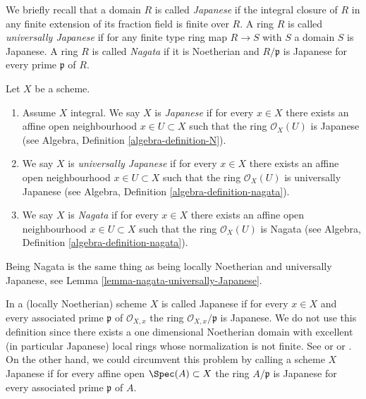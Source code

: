 \medskip\noindent
We briefly recall that a domain $R$ is called {\it Japanese} if the integral
closure of $R$ in any finite extension of its fraction field is finite over
$R$. A ring $R$ is called {\it universally Japanese} if for any finite type
ring map $R \to S$ with $S$ a domain $S$ is Japanese. A ring $R$ is called
{\it Nagata} if it is Noetherian and $R/\mathfrak p$ is Japanese for every
prime $\mathfrak p$ of $R$.

\begin{definition}
\label{definition-nagata}
Let $X$ be a scheme.
\begin{enumerate}
\item Assume $X$ integral. We say $X$ is {\it Japanese}
if for every $x \in X$ there exists an
affine open neighbourhood $x \in U \subset X$ such that the ring
$\mathcal{O}_X(U)$ is Japanese (see
Algebra, Definition \ref{algebra-definition-N}).
\item We say $X$ is {\it universally Japanese} if for every $x \in X$
there exists an affine open neighbourhood $x \in U \subset X$ such that
the ring $\mathcal{O}_X(U)$ is universally Japanese (see
Algebra, Definition \ref{algebra-definition-nagata}).
\item We say $X$ is {\it Nagata} if for every $x \in X$ there exists an
affine open neighbourhood $x \in U \subset X$ such that the ring
$\mathcal{O}_X(U)$ is Nagata (see
Algebra, Definition \ref{algebra-definition-nagata}).
\end{enumerate}
\end{definition}

\noindent
Being Nagata is the same thing as being locally Noetherian
and universally Japanese, see
Lemma \ref{lemma-nagata-universally-Japanese}.

\begin{remark}
\label{remark-non-integral-Japanese}
In \cite{Hoobler-finite} a (locally Noetherian) scheme $X$ is called
Japanese if for every $x \in X$ and every associated prime $\mathfrak p$
of $\mathcal{O}_{X, x}$ the ring $\mathcal{O}_{X, x}/\mathfrak p$ is
Japanese. We do not use this definition since there exists a one
dimensional Noetherian domain with excellent (in particular
Japanese) local rings whose normalization is not finite. See
\cite[Example 1]{Hochster-loci} or \cite{Heinzer-Levy} or
\cite[Expos\'e XIX]{Traveaux}.
On the other hand, we could circumvent this problem by calling a scheme
$X$ Japanese if for every affine open $\Spec(A) \subset X$ the ring
$A/\mathfrak p$ is Japanese for every associated prime $\mathfrak p$ of $A$.
\end{remark}

